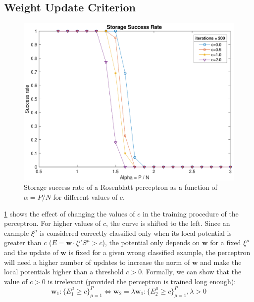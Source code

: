 \subsection{Weight Update Criterion}
\label{subsec:c}
\begin{figure}[t]
	\centering
	\includegraphics[width=\columnwidth]{figures/bonus_2_c}
    \caption{Storage success rate of a Rosenblatt perceptron as a function of $\alpha = P / N$ for different values of $c$.}
	\label{fig:multiple_c}
\end{figure}
\cref{fig:multiple_c} shows the effect of changing the values of $c$ in the training procedure of the perceptron.
For higher values of $c$, the curve is shifted to the left.
Since an example $\xi^\mu$ is considered correctly classified only when its local potential is greater than $c$ ($E = \mathsf{\bm{w}} \cdot \xi^\mu S^\mu > c$), the potential only depends on $\mathsf{\bm{w}}$ for a fixed $\xi^\mu$ and the update of $\mathsf{\bm{w}}$ is fixed for a given wrong classified example, the perceptron will need a higher number of updates to increase the norm of $\mathsf{\bm{w}}$ and make the local potentials higher than a threshold $c > 0$.
Formally, we can show that the value of $c > 0$ is irrelevant (provided the perceptron is trained long enough):
\begin{equation*}
	\mathsf{\bm{w}}_1 : \{E_1^\mu \geq c\}_{\mu = 1}^{P} \Leftrightarrow \mathsf{\bm{w}}_2 = \lambda \mathsf{\bm{w}}_1 : \{E_2^\mu \geq c\}_{\mu = 1}^{P}, \lambda > 0
\end{equation*}

